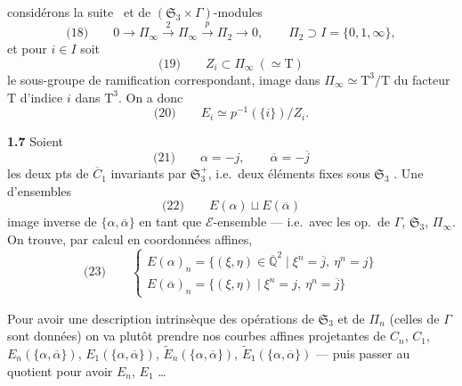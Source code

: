 \documentclass[11pt,a4paper]{article}
\begin{document}
considérons la suite  \ et \struck{$\mu_\infty$} de $(\mathfrak{S}_3 \times \Gamma)$-modules
\[
  \text{(18)} \qquad 0 \longrightarrow \Pi_\infty \xrightarrow{\ 2\ } \Pi_\infty \xrightarrow{\ p\ } \Pi_2 \longrightarrow 0, \qquad \Pi_2 \supset I = \{0, 1, \infty\},
\]
et pour $i \in I$ soit
\[
  \text{(19)} \qquad Z_i \subset \Pi_\infty \ (\simeq \mathrm{T})
\]
le sous-groupe de ramification correspondant, image dans $\Pi_\infty \simeq \mathrm{T}^{3}/\mathrm{T}$ du  facteur $\mathrm{T}$ d'indice $i$ dans $\mathrm{T}^{3}$.  On a donc
\[
  \text{(20)} \qquad E_i \simeq p^{-1}(\{i\})/Z_i .
\]

\textbf{1.7} Soient
\[
  \text{(21)} \qquad \alpha = -j, \qquad \overline{\alpha} = -\overline{j}
\]
les deux pts de $\overline{C}_1$ invariants par $\mathfrak{S}_3^{+}$, i.e.\ deux éléments  fixes sous $\mathfrak{S}_3$ . Une \ill{} d'ensembles
\[
  \text{(22)} \qquad E(\alpha) \sqcup E(\overline{\alpha})
\]
image inverse de $\{\alpha, \overline{\alpha}\}$ en tant que $\mathcal{E}$-ensemble --- i.e.\ avec les op.\ de $\Gamma$, $\mathfrak{S}_3$, $\Pi_\infty$. On trouve, par calcul en coordonnées affines,
\[
  \text{(23)} \qquad
  \begin{cases}
    E(\alpha)_n = \{(\xi, \eta) \in \overline{\mathbb{Q}}^{2} \mid \xi^{n} = \overline{j},\ \eta^{n} = j\} \\
    E(\overline{\alpha})_n = \{(\xi, \eta) \mid \xi^{n} = j,\ \eta^{n} = \overline{j}\}
  \end{cases}
\]

Pour avoir une description intrinsèque des opérations de $\mathfrak{S}_3$ et de $\Pi_n$ (celles de $\Gamma$ sont données) on va  plutôt \struck{\ill{}} prendre nos courbes affines projetantes de $C_n$, $C_1$,  $E_n(\{\alpha, \overline{\alpha}\})$, $E_1(\{\alpha, \overline{\alpha}\})$, \struck{\ill{}} $\widetilde{E}_n(\{\alpha, \overline{\alpha}\})$, $\widetilde{E}_1(\{\alpha, \overline{\alpha}\})$ --- puis \struck{\ill{}} passer au quotient pour avoir $E_n$, $E_1$ \ldots
{}
\end{document}
